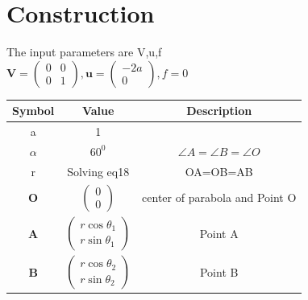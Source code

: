 \documentclass[journal,10pt,twocolumn]{article}
\let\vec\mathbf
\newcommand{\myvec}[1]{\ensuremath{\begin{pmatrix}#1\end{pmatrix}}}
\begin{document}
 \section*{\large Construction} The input parameters are V,u,f \\
 $\vec{V}=\myvec{0&0\\0&1},\vec{u}=\myvec{-2a\\0},f=0$\\
\setlength\extrarowheight{7pt}
\begin{tabular}{|c|c|c|}
  \hline
  \textbf{Symbol}&\textbf{Value}&\textbf{Description}\\
  \hline
	a&1&\\
  \hline
	$\alpha$&$60^{0}$&$\angle{A}=\angle{B}=\angle{O}$\\
	\hline
	r&Solving eq18&OA=OB=AB\\
	\hline
  $\vec{O}$&$\myvec{0\\0}$&center of parabola and Point O\\
  \hline
	$\vec{A}$&$\myvec{r\cos{\theta_1}\\r\sin{\theta_1}}$&Point A\\[8pt]
  \hline
	$\vec{B}$&$\myvec{r\cos{\theta_2}\\r\sin{\theta_2}}$&Point B\\[8pt]  \hline
\end{tabular}
\end{document}
